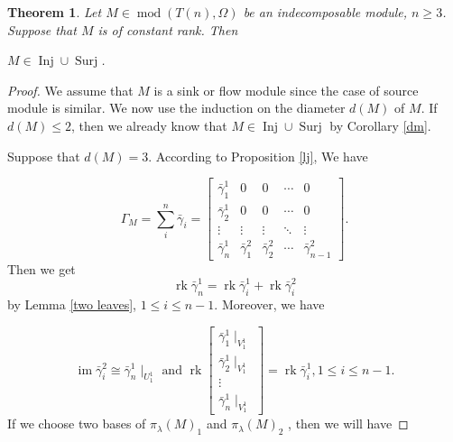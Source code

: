 \documentclass[a4paper,12pt]{amsart}
\newcommand{\bg}{\bar{\gamma}}
\DeclareMathOperator{\rk}{rk}
\DeclareMathOperator{\modd}{mod}
\DeclareMathOperator{\im}{im}
\DeclareMathOperator{\Inj}{Inj}
\DeclareMathOperator{\Sur}{Surj}
\newtheorem{Theorem}[proposition]{Theorem}
\begin{document}
\begin{Theorem}\label{es}
Let $M\in \modd(T(n),\Omega)$ be an indecomposable module, $n\geq 3$. Suppose that $M$ is of constant rank. Then

\begin{center}
$M\in \Inj\cup \Sur$.
\end{center}

\end{Theorem}
\begin{proof}
We  assume that $M$ is a sink or flow module since the case of source module is similar.  We now use the induction on the diameter $d(M)$ of $M$.  If $d(M)\leq 2$,  then we already know that $M\in \Inj\cup \Sur$ by Corollary  \ref{dm}.
 
Suppose that $d(M)=3$. According to  Proposition \ref{lj},  We have 

\begin{equation}\label{og}
\Gamma_M=\sum^n_i \bg_i=\begin{bmatrix}
\bg^1_1 & 0 & 0&  \cdots & 0 \\
\bg^1_2 & 0& 0&  \cdots & 0  \\
\vdots & \vdots & \vdots  & \ddots  & \vdots \\
\bg^1_n & \bg^2_1 & \bg^2_2 & \cdots & \bg^2_{n-1}
\end{bmatrix}. 
\end{equation}
Then  we get  
\begin{equation}\label{m1}
 \rk \bg^1_n=\rk\bg^1_i+\rk \bg^2_i  
\end{equation}
by Lemma \ref{two leaves},   $1\leq i\leq n-1$. Moreover, we have 


\begin{equation}\label{Step1}
\im \bg^2_i \cong \bg^1_n\mid_{U^1_1} \text{ and } \rk \begin{bmatrix}
\bg^1_1\mid_{V^1_1} \\
\bg^1_2\mid_{V^1_1}\\
\vdots\\
\bg^1_n\mid_{V^1_1}
\end{bmatrix}=\rk \bg^1_i , 1\leq i \leq n-1.
\end{equation}
If we choose two bases of $\pi_\lambda(M)_1$ and $\pi_\lambda(M)_2$ , then we will have 


\end{proof}
\end{document}
